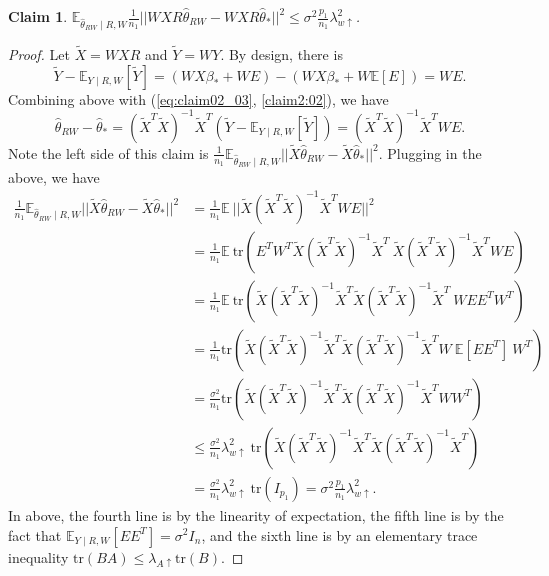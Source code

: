 \documentclass[a4paper,fleqn]{cas-sc}
\theoremstyle{plain}
\newtheorem{claim}[theorem]{Claim}
\newcommand{\E}{\mathbb{E}}
\newcommand{\tX}{\tilde{X}}
\newcommand{\tY}{\tilde{Y}}
\newcommand{\be}{\beta}
\newcommand{\hte}{\hat{\theta}}
\newcommand{\mtr}{\mathrm{tr}}
\begin{document}
\begin{claim}
\label{claim:04}
$\E_{\hte_{RW} \mid R,W} 
\frac{1}{n_1} 
|| WXR \hte_{RW} - WXR \hte_* ||^2 
\leq \sigma^2 \frac{p_1}{n_1} 
\lambda_{w \uparrow}^2$.
\end{claim}
\begin{proof}
Let $\tX = WXR$ and $\tY = WY$. 
By design, there is 
\begin{equation}
\tY - \E_{Y \mid R, W}[\tY] 
= (W X \be_* + W E)  
- (W X \be_* + W \E[E]) 
= WE.
\end{equation}
Combining above with 
(\ref{eq:claim02_03}, 
\ref{claim2:02}), we have 
\begin{equation}
\hte_{RW} - \hte_{*} 
= (\tX^T \tX)^{-1} \tX^T 
(\tY - \E_{Y \mid R, W} [\tY]) 
= (\tX^T \tX)^{-1} \tX^T W E.
\end{equation}
Note the left side of this claim 
is $\frac{1}{n_1} 
\E_{\hte_{RW} \mid R,W} 
|| \tX \hte_{RW} - \tX \hte_* ||^2$.  
Plugging in the above, we have 
\begin{equation}
\begin{split}
\frac{1}{n_1} \E_{\hte_{RW} \mid R,W}  
|| \tX \hte_{RW} - \tX \hte_* ||^2 
& = \frac{1}{n_1} \E\ ||\tX (\tX^T \tX)^{-1} \tX^T W E||^2\\ 
& = \frac{1}{n_1} \E\ \mtr ( 
E^T W^T \tX (\tX^T \tX)^{-1} \tX^T
\ \tX (\tX^T \tX)^{-1} \tX^T W E )\\
& = \frac{1}{n_1} 
\E\ \mtr ( \tX (\tX^T \tX)^{-1} \tX^T
\tX (\tX^T \tX)^{-1} \tX^T\ W E E^T W^T )\\
& = \frac{1}{n_1} 
\mtr ( \tX (\tX^T \tX)^{-1} \tX^T
\tX (\tX^T \tX)^{-1} \tX^T W\ 
\E [E E^T]\ W^T )\\
& = \frac{\sigma^2}{n_1} 
\mtr ( \tX (\tX^T \tX)^{-1} \tX^T
\tX (\tX^T \tX)^{-1} \tX^T W W^T )\\
& \leq \frac{\sigma^2}{n_1} 
\lambda^2_{w \uparrow}\ 
\mtr ( \tX (\tX^T \tX)^{-1} \tX^T
\tX (\tX^T \tX)^{-1} \tX^T )\\
& = \frac{\sigma^2}{n_1} 
\lambda^2_{w \uparrow}\ 
\mtr ( I_{p_1} ) = \sigma^2 \frac{p_1}{n_1} 
\lambda^2_{w \uparrow}.
\end{split}
\end{equation}
In above, the fourth line is by 
the linearity of expectation,  
the fifth line is by the fact 
that $\E_{Y \mid R, W} [EE^T] 
= \sigma^2 I_{n}$, and the 
sixth line is by an elementary 
trace inequality $\mtr(B A) 
\leq \lambda_{A \uparrow} 
\mtr(B)$. 
\end{proof}
\end{document}
